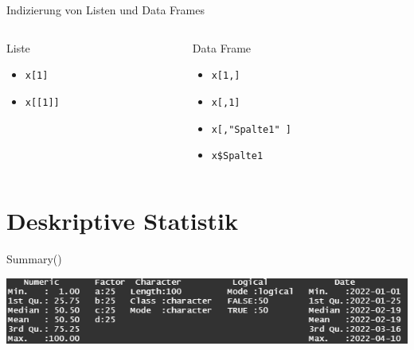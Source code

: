 \documentclass[xcolor=dvipsnames, aspectratio = 169]{beamer}
\begin{document}
\begin{frame}[fragile]{Indizierung von Listen und Data Frames}
	
	\begin{columns}[T]
	\begin{column}{0.5\textwidth}
Liste
		\begin{itemize}
		\item \verb+x[1]+
		\item \verb+x[[1]]+
	\end{itemize}
	\end{column}
	\begin{column}{0.5\textwidth}
Data Frame
	\begin{itemize}
		\item  \verb+x[1,]+
		\item  \verb+x[,1]+
		\item  \verb+x[,"Spalte1" ]+
		\item  \verb+x$Spalte1+
	\end{itemize}
	\end{column}
\end{columns}

\end{frame}

\section{Deskriptive Statistik}

\begin{frame}{Summary()}
	\begin{center}
		\includegraphics[scale=0.9]{Summary}
	\end{center}
\end{frame}
\end{document}
